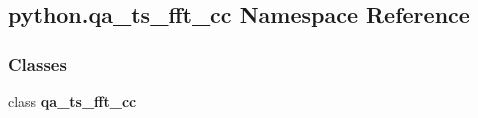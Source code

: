 \subsection{python.\+qa\+\_\+ts\+\_\+fft\+\_\+cc Namespace Reference}
\label{namespacepython_1_1qa__ts__fft__cc}
\subsubsection*{Classes}
\begin{DoxyCompactItemize}
\item 
class {\bf qa\+\_\+ts\+\_\+fft\+\_\+cc}
\end{DoxyCompactItemize}
